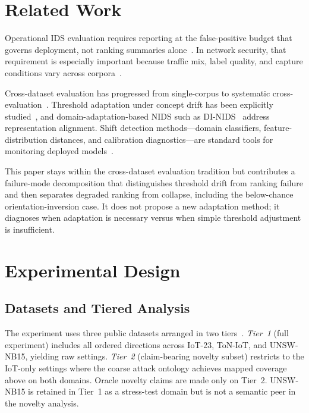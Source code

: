 \documentclass[10pt,conference]{IEEEtran}
\begin{document}
\section{Related Work}

Operational IDS evaluation requires reporting at the false-positive budget that governs deployment, not ranking summaries alone~\cite{axelsson2000baserate,fawcett2006roc,davis2006pr}. In network security, that requirement is especially important because traffic mix, label quality, and capture conditions vary across corpora~\cite{ring2019survey}.

Cross-dataset evaluation has progressed from single-corpus to systematic cross-evaluation~\cite{dhooge2020inter,xenids2022,commonfeat2022,layeghy2024benchmarking,iwanowski2025choice}. Threshold adaptation under concept drift has been explicitly studied~\cite{jordaney2017transcend}, and domain-adaptation-based NIDS such as DI-NIDS~\cite{dinids2021} address representation alignment. Shift detection methods---domain classifiers, feature-distribution distances, and calibration diagnostics---are standard tools for monitoring deployed models~\cite{ben2010domain,ovadia2019uncertainty,rabanser2019failing,hendrycks2017baseline}.

This paper stays within the cross-dataset evaluation tradition but contributes a failure-mode decomposition that distinguishes threshold drift from ranking failure and then separates degraded ranking from collapse, including the below-chance orientation-inversion case. It does not propose a new adaptation method; it diagnoses when adaptation is necessary versus when simple threshold adjustment is insufficient.

\section{Experimental Design}

\subsection{Datasets and Tiered Analysis}

The experiment uses three public datasets arranged in two tiers~\cite{garcia2020iot23,booij2022ton,moustafa2015unsw}. \emph{Tier~1} (full experiment) includes all \DirectionCount{} ordered directions across IoT-23, ToN-IoT, and UNSW-NB15, yielding \NaturalSettingCount{} raw settings. \emph{Tier~2} (claim-bearing novelty subset) restricts to the \PrimaryIotSettingCount{} IoT-only settings where the coarse attack ontology achieves mapped coverage above \NoveltyCoverageFloor{} on both domains. Oracle novelty claims are made only on Tier~2. UNSW-NB15 is retained in Tier~1 as a stress-test domain but is not a semantic peer in the novelty analysis.
\end{document}
